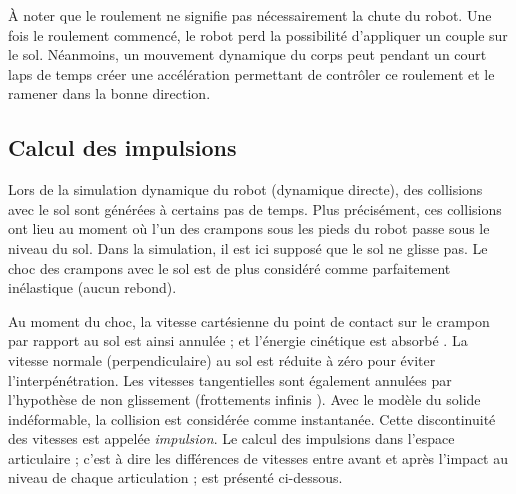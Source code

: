À noter que le roulement ne signifie pas nécessairement la chute du robot.
Une fois le roulement commencé, le robot perd la possibilité d'appliquer 
un couple sur le sol. Néanmoins, un mouvement dynamique du corps
peut pendant un court laps de temps créer une accélération permettant
de contrôler ce roulement et le ramener dans la bonne direction.

\subsection{Calcul des impulsions}

Lors de la simulation dynamique du robot (dynamique directe), 
des collisions avec le sol sont générées 
à certains pas de temps.
Plus précisément, ces collisions ont lieu au moment où
l'un des crampons sous les pieds du robot passe sous le niveau du sol.
Dans la simulation, il est ici supposé que le sol ne glisse pas.
Le choc des crampons avec le sol est de plus considéré
comme parfaitement inélastique (aucun rebond).

Au moment du choc, la vitesse cartésienne du point de contact 
sur le crampon par rapport au sol est ainsi annulée ; 
et l'énergie cinétique est \og absorbé \fg.
La vitesse normale (perpendiculaire) au sol est réduite à zéro pour éviter
l'interpénétration. Les vitesses tangentielles sont également
annulées par l'hypothèse de non glissement (frottements \og infinis \fg).
Avec le modèle du solide indéformable, la collision
est considérée comme instantanée.
Cette discontinuité des vitesses est appelée \textit{impulsion}.
Le calcul des impulsions dans l'espace articulaire ; c'est à dire
les différences de vitesses entre avant et après l'impact au niveau 
de chaque articulation ; est présenté ci-dessous.\\

